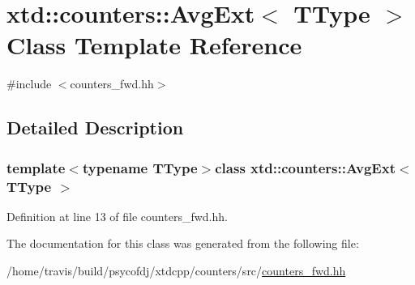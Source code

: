 \hypertarget{classxtd_1_1counters_1_1AvgExt}{\section{xtd\-:\-:counters\-:\-:Avg\-Ext$<$ T\-Type $>$ Class Template Reference}
\label{classxtd_1_1counters_1_1AvgExt}
}


{\ttfamily \#include $<$counters\-\_\-fwd.\-hh$>$}



\subsection{Detailed Description}
\subsubsection*{template$<$typename T\-Type$>$class xtd\-::counters\-::\-Avg\-Ext$<$ T\-Type $>$}



Definition at line 13 of file counters\-\_\-fwd.\-hh.



The documentation for this class was generated from the following file\-:\begin{DoxyCompactItemize}
\item 
/home/travis/build/psycofdj/xtdcpp/counters/src/\hyperlink{counters__fwd_8hh}{counters\-\_\-fwd.\-hh}\end{DoxyCompactItemize}
